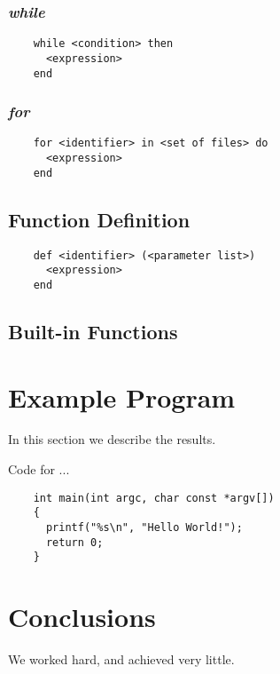 \documentclass[11pt]{article}
\begin{document}
\subsubsection{\emph{while}}
\begin{listing}[H]
  \begin{verbatim}
    while <condition> then
      <expression>
    end
  \end{verbatim}
  \label{lst:the-code}
\end{listing}

\subsubsection{\emph{for}}
\begin{listing}[H]
  \begin{verbatim}
    for <identifier> in <set of files> do
      <expression>
    end
  \end{verbatim}
  \label{lst:the-code}
\end{listing}
\subsection{Function Definition}
\begin{listing}[H]
  \begin{verbatim}
    def <identifier> (<parameter list>)
      <expression>
    end
  \end{verbatim}
  \label{lst:the-code}
\end{listing}

\subsection{Built-in Functions}

\section{Example Program}\label{results}
In this section we describe the results.
\begin{listing}[H]
  \caption{Code for ...}
  \begin{verbatim}
    int main(int argc, char const *argv[])
    {
      printf("%s\n", "Hello World!");
      return 0;
    }
  \end{verbatim}
  \label{lst:the-code}
\end{listing}

\section{Conclusions}\label{conclusions}
We worked hard, and achieved very little.
\end{document}
